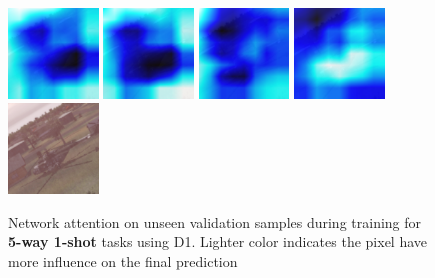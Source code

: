 \begin{figure}[H]
  {\includegraphics[height=2.4cm, width=2.4cm]{images/vbs3/gradcam/5-5/3/Heat_map_of_iterations_0.png}}
  {\includegraphics[height=2.4cm, width=2.4cm]{images/vbs3/gradcam/5-5/3/Heat_map_of_iterations_1.png}}
  {\includegraphics[height=2.4cm, width=2.4cm]{images/vbs3/gradcam/5-5/3/Heat_map_of_iterations_3.png}}
%
  {\includegraphics[height=2.4cm, width=2.4cm]{images/vbs3/gradcam/5-5/3/Heat_map_of_iterations_5.png}}
  {\includegraphics[height=2.4cm, width=2.4cm]{images/vbs3/gradcam/5-5/3/Test_Images.png}}
  
\caption{Network attention on unseen validation samples during training for \textbf{5-way 1-shot} tasks using D1. Lighter color indicates the pixel have more influence on the final prediction}
\label{grad-cam-5-5}
\end{figure}


